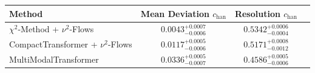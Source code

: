     \begin{tabular}{lccc}
        \toprule
        Method & Mean Deviation $c_{\text{han}}$ & Resolution $c_{\text{han}}$ \\
        \midrule
        $\chi^2$-Method + $\nu^2$-Flows & $0.0043^{+0.0007}_{-0.0006}$ & $0.5342^{+0.0006}_{-0.0004}$ \\
        CompactTransformer + $\nu^2$-Flows & $0.0117^{+0.0005}_{-0.0006}$ & $0.5171^{+0.0008}_{-0.0012}$ \\
        MultiModalTransformer & $0.0336^{+0.0005}_{-0.0007}$ & $0.4586^{+0.0005}_{-0.0006}$ \\
        \bottomrule
    \end{tabular}